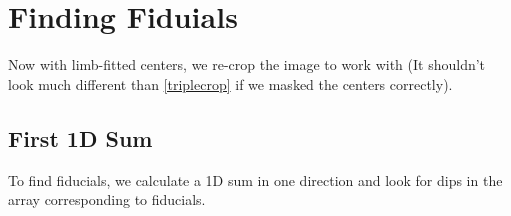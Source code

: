 \documentclass[10pt]{scrartcl}
\begin{document}

\section{Finding Fiduials} %
\label{sec:finding_fiduials}

Now with limb-fitted centers, we re-crop the image to work with (It shouldn't look much different than \cref{triplecrop} if we masked the centers correctly).

\subsection{First 1D Sum} %
\label{sub:first_1d_sum}

To find fiducials, we calculate a 1D sum in one direction and look for dips in the array corresponding to fiducials. 
\end{document}
